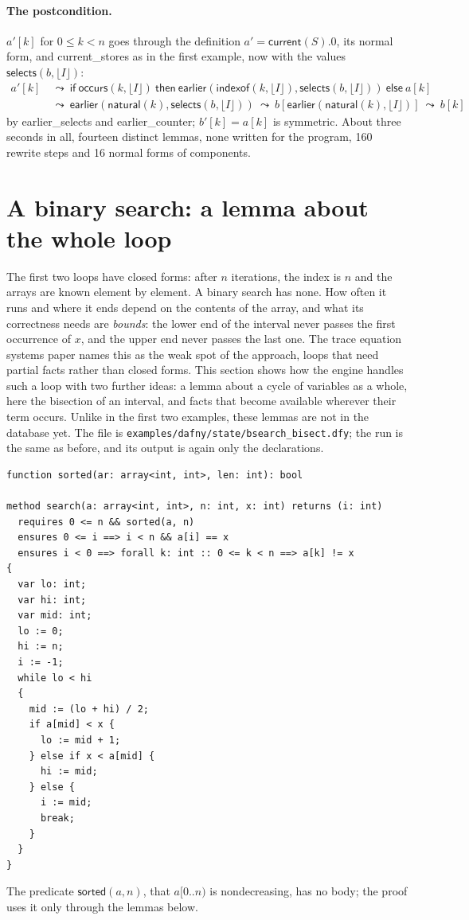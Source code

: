 \documentclass[11pt,a4paper]{article}
\newcommand{\bl}[1]{\lfloor #1\rfloor}                       %
\newcommand{\cur}{\mathsf{current}}
\newcommand{\ear}{\mathsf{earlier}}
\newcommand{\natf}{\mathsf{natural}}
\newcommand{\selects}{\mathsf{selects}}
\newcommand{\occurs}{\mathsf{occurs}}
\newcommand{\indexof}{\mathsf{indexof}}
\newcommand{\lemma}[1]{\textsf{#1}}
\newcommand{\rw}{\ \leadsto\ }
\begin{document}
\paragraph{The postcondition.} $a'[k]$ for $0 \le k < n$ goes through the definition $a' = \cur(S).0$, its normal
form, and \lemma{current\_stores} as in the first example, now with the values $\selects(b, \bl{I})$:
\begin{align*}
a'[k] &\rw \mathsf{if}\ \occurs(k, \bl{I})\ \mathsf{then}\ \ear(\indexof(k, \bl{I}), \selects(b, \bl{I}))\ \mathsf{else}\ a[k] \\
&\rw \ear(\natf(k), \selects(b, \bl{I})) \rw b[\ear(\natf(k), \bl{I})] \rw b[k]
\end{align*}
by \lemma{earlier\_selects} and \lemma{earlier\_counter}; $b'[k] = a[k]$ is symmetric. About three seconds in all,
fourteen distinct lemmas, none written for the program, 160 rewrite steps and 16 normal forms of components.

\section{A binary search: a lemma about the whole loop}

The first two loops have closed forms: after $n$ iterations, the index is $n$ and the arrays are known element by
element. A binary search has none. How often it runs and where it ends depend on the contents of the array, and
what its correctness needs are \emph{bounds}: the lower end of the interval never passes the first occurrence of
$x$, and the upper end never passes the last one. The trace equation systems paper names this as the weak spot of
the approach, loops that need partial facts rather than closed forms. This section shows how the engine handles
such a loop with two further ideas: a lemma about a cycle of variables as a whole, here the bisection of an
interval, and facts that become available wherever their term occurs. Unlike in the first two examples, these
lemmas are not in the database yet. The file is \texttt{examples/dafny/state/bsearch\_bisect.dfy}; the run is the
same as before, and its output is again only the declarations.

\begin{lstlisting}
function sorted(ar: array<int, int>, len: int): bool

method search(a: array<int, int>, n: int, x: int) returns (i: int)
  requires 0 <= n && sorted(a, n)
  ensures 0 <= i ==> i < n && a[i] == x
  ensures i < 0 ==> forall k: int :: 0 <= k < n ==> a[k] != x
{
  var lo: int;
  var hi: int;
  var mid: int;
  lo := 0;
  hi := n;
  i := -1;
  while lo < hi
  {
    mid := (lo + hi) / 2;
    if a[mid] < x {
      lo := mid + 1;
    } else if x < a[mid] {
      hi := mid;
    } else {
      i := mid;
      break;
    }
  }
}
\end{lstlisting}
The predicate $\mathsf{sorted}(a, n)$, that $a[0..n)$ is nondecreasing, has no body; the proof uses it only through
the lemmas below.
\end{document}

